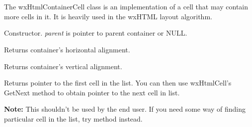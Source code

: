 %
%

\section{}\label{wxhtmlcontainercell}

The wxHtmlContainerCell class is an implementation of a cell that may
contain more cells in it. It is heavily used in the wxHTML layout algorithm.






\label{wxhtmlcontainercellwxhtmlcontainercell}


Constructor. {\it parent} is pointer to parent container or NULL.


\label{wxhtmlcontainercellgetalignhor}


Returns container's horizontal alignment.

\label{wxhtmlcontainercellgetalignver}


Returns container's vertical alignment.

\label{wxhtmlcontainercellgetfirstcell}


Returns pointer to the first cell in the list.
You can then use wxHtmlCell's GetNext method to obtain pointer to the next
cell in list.

{\bf Note:} This shouldn't be used by the end user. If you need some way of
finding particular cell in the list, try  method
instead.

\label{wxhtmlcontainercellgetindent}

